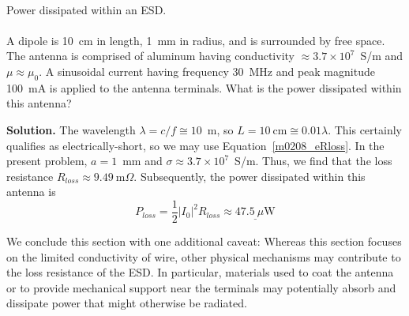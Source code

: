 ~\\ \begin{example} 
\begin{mdframed}[backgroundcolor=brown!20,linecolor=brown!20]\raggedright
Power dissipated within an ESD. 
\\~\\
A dipole is 10~cm in length, 1~mm in radius, and is surrounded by free space.
The antenna is comprised of aluminum having conductivity $\approx 3.7 \times 10^7$~S/m and $\mu\approx\mu_0$.
A sinusoidal current having frequency 30~MHz and peak magnitude 100~mA is applied to the antenna terminals.
What is the power dissipated within this antenna?

{\bf Solution.}
The wavelength $\lambda=c/f \cong 10$~m, so $L = 10~\mbox{cm} \cong 0.01\lambda$.
This certainly qualifies as electrically-short, so we may use Equation~\ref{m0208_eRloss}.
In the present problem, $a=1$~mm and $\sigma\approx 3.7 \times 10^7$~S/m.
Thus, we find that the loss resistance $R_{loss} \approx 9.49~\mbox{m}\Omega$.
Subsequently, the power dissipated within this antenna is 
%
\begin{equation}
P_{loss} = \frac{1}{2}\left|I_0\right|^2 R_{loss} \approx \underline{47.5~\mu\mbox{W}}
\end{equation}

\end{mdframed}
\end{example}

We conclude this section with one additional caveat:
Whereas this section focuses on the limited conductivity of wire,
other physical mechanisms may contribute to the loss resistance of the ESD.
In particular, materials used to coat the antenna or to provide mechanical support near the terminals may potentially absorb and dissipate power that might otherwise be radiated. 


